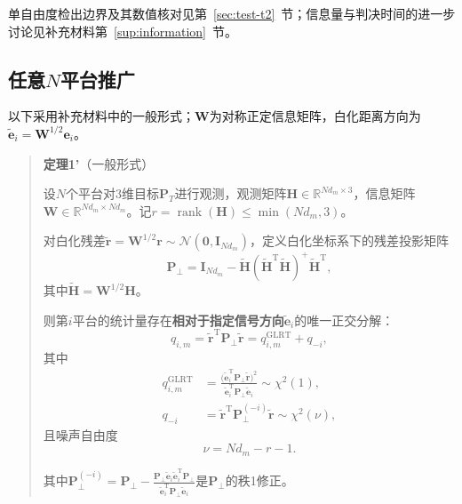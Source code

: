\documentclass[UTF8,a4paper,zihao=-4]{ctexart}
\begin{document}
单自由度检出边界及其数值核对见第~\ref{sec:test-t2}~节；信息量与判决时间的进一步讨论见补充材料第~\ref{sup:information}~节。



\subsection{任意\(N\)平台推广}\label{sec:generalization}
以下采用补充材料中的一般形式；\(\boldsymbol W\)为对称正定信息矩阵，白化距离方向为\(\widetilde{\boldsymbol e}_i=\boldsymbol W^{1/2}\boldsymbol e_i\)。

\begin{quote}
\textbf{定理1'}（一般形式）

设\(N\)个平台对3维目标\(\mathbf{P}_T\)进行观测，观测矩阵\(\mathbf{H}\in\mathbb{R}^{Nd_m\times 3}\)，信息矩阵\(\mathbf{W}\in\mathbb{R}^{Nd_m\times Nd_m}\)。记\(r=\operatorname{rank}(\mathbf{H})\leq\min(Nd_m,3)\)。

对白化残差\(\widetilde{\mathbf{r}}=\mathbf{W}^{1/2}\mathbf{r}\sim\mathcal{N}(\mathbf{0},\mathbf{I}_{Nd_m})\)，定义白化坐标系下的残差投影矩阵
\begin{equation}
\mathbf{P}_{\perp}= \mathbf{I}_{Nd_m}-\widetilde{\mathbf{H}}(\widetilde{\mathbf{H}}^{\mathrm{T}}\widetilde{\mathbf{H}})^{+}\widetilde{\mathbf{H}}^{\mathrm{T}},
\end{equation}
其中\(\widetilde{\mathbf{H}}=\mathbf{W}^{1/2}\mathbf{H}\)。

则第\(i\)平台的统计量存在\textbf{相对于指定信号方向\(\widetilde{\mathbf{e}}_i\)}的唯一正交分解：
\begin{equation}
q_{i,m} = \widetilde{\mathbf{r}}^{\mathrm{T}}\mathbf{P}_{\perp}\widetilde{\mathbf{r}} = q^{\mathrm{GLRT}}_{i,m} + q_{-i},
\end{equation}
其中
\begin{align}
q^{\mathrm{GLRT}}_{i,m} &= \frac{\bigl(\widetilde{\mathbf{e}}_i^{\mathrm T}\mathbf{P}_{\perp}\widetilde{\mathbf{r}}\bigr)^2}{\widetilde{\mathbf{e}}_i^{\mathrm T}\mathbf{P}_{\perp}\widetilde{\mathbf{e}}_i} \sim \chi^2(1), \\
q_{-i} &= \widetilde{\mathbf{r}}^{\mathrm{T}}\mathbf{P}_{\perp}^{(-i)}\widetilde{\mathbf{r}} \sim \chi^2(\nu),
\end{align}
且噪声自由度
\begin{equation}
\nu = Nd_m - r - 1.
\end{equation}

其中\(\mathbf{P}_{\perp}^{(-i)} = \mathbf{P}_{\perp} - \frac{\mathbf{P}_{\perp}\widetilde{\mathbf{e}}_i\widetilde{\mathbf{e}}_i^{\mathrm{T}}\mathbf{P}_{\perp}}{\widetilde{\mathbf{e}}_i^{\mathrm{T}}\mathbf{P}_{\perp}\widetilde{\mathbf{e}}_i}\)是\(\mathbf{P}_{\perp}\)的秩1修正。


\end{quote}
\end{document}
